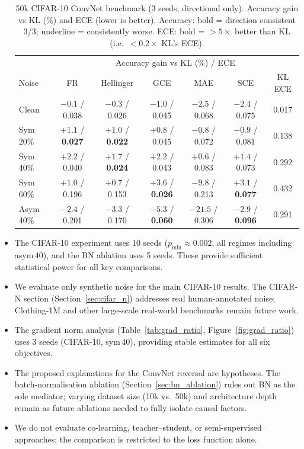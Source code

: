 \documentclass[11pt]{article}
\begin{document}
\begin{itemize}
\begin{table}[h]
  \centering
  \caption{50k CIFAR-10 ConvNet benchmark (3 seeds, directional only).
    Accuracy gain vs KL (\%) and ECE (lower is better).
    Accuracy: bold = direction consistent 3/3; underline = consistently worse.
    ECE: bold = $>5\times$ better than KL (i.e.\ $<0.2\times$ KL's ECE).}
  \label{tab:50k}
  \small
  \begin{tabular}{lcccccc}
    \toprule
    & \multicolumn{6}{c}{Accuracy gain vs KL (\%) / ECE} \\
    \cmidrule(lr){2-7}
    Noise & FR & Hellinger & GCE & MAE & SCE & KL ECE \\
    \midrule
    Clean    & $-0.1$ / 0.038 & $-0.3$ / 0.026 & $-1.0$ / 0.045 & $-2.5$ / 0.068 & $-2.4$ / 0.075 & 0.017 \\
    Sym 20\% & $\mathbf{+1.1}$ / \textbf{0.027} & $\mathbf{+1.0}$ / \textbf{0.022} & $\mathbf{+0.8}$ / 0.045 & $\underline{-0.8}$ / 0.072 & $\underline{-0.9}$ / 0.081 & 0.138 \\
    Sym 40\% & $\mathbf{+2.2}$ / 0.040 & $\mathbf{+1.7}$ / \textbf{0.024} & $\mathbf{+2.2}$ / 0.043 & $+0.6$ / 0.083 & $+1.4$ / 0.073 & 0.292 \\
    Sym 60\% & $\mathbf{+1.0}$ / 0.196 & $\mathbf{+0.7}$ / 0.153 & $\mathbf{+3.6}$ / \textbf{0.026} & $\underline{-9.8}$ / 0.213 & $\mathbf{+3.1}$ / \textbf{0.077} & 0.432 \\
    Asym 40\% & $\underline{-2.4}$ / 0.201 & $\underline{-3.3}$ / 0.170 & $\underline{-5.3}$ / \textbf{0.060} & $\underline{-21.5}$ / 0.306 & $\underline{-2.9}$ / \textbf{0.096} & 0.291 \\
    \bottomrule
  \end{tabular}
\end{table}
  \item The CIFAR-10 experiment uses 10 seeds ($p_{\min}\approx0.002$, all regimes
    including asym\,40), and the BN ablation uses 5 seeds. These provide sufficient
    statistical power for all key comparisons.
  \item We evaluate only synthetic noise for the main CIFAR-10 results.
    The CIFAR-N section (Section~\ref{sec:cifar_n}) addresses real human-annotated
    noise; Clothing-1M and other large-scale real-world benchmarks remain future work.
  \item The gradient norm analysis (Table~\ref{tab:grad_ratio},
    Figure~\ref{fig:grad_ratio}) uses 3 seeds (CIFAR-10, sym\,40), providing
    stable estimates for all six objectives.
  \item The proposed explanations for the ConvNet reversal are hypotheses.
    The batch-normalisation ablation (Section~\ref{sec:bn_ablation}) rules out
    BN as the sole mediator; varying dataset size (10k vs.\ 50k) and architecture
    depth remain as future ablations needed to fully isolate causal factors.
  \item We do not evaluate co-learning, teacher--student, or semi-supervised
    approaches; the comparison is restricted to the loss function alone.
\end{itemize}
\end{document}
